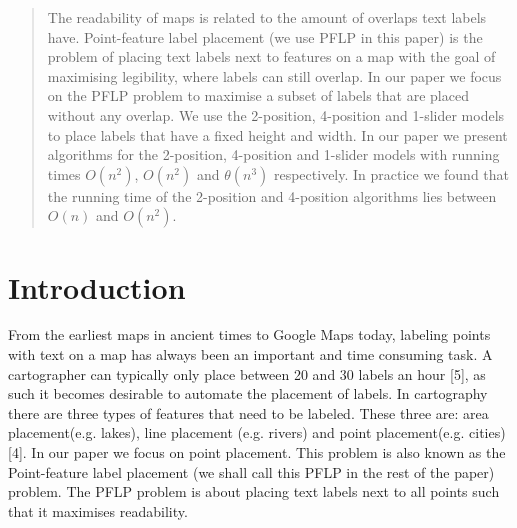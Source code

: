 \documentclass[crop=false,a4paper,oneside,11pt]{standalone}
\begin{document}
\begin{abstract}
The readability of maps is related to the amount of overlaps text labels have. Point-feature label placement (we use PFLP in this paper) is the problem of placing text labels next to features on a map with the goal of maximising legibility, where labels can still overlap. In our paper we focus on the PFLP problem to maximise a subset of labels that are placed without any overlap. We use the 2-position, 4-position and 1-slider models to place labels that have a fixed height and width. In our paper we present algorithms for the 2-position, 4-position and 1-slider models with running times $O(n^2)$, $O(n^2)$ and $\theta(n^3)$ respectively. In practice we found that the running time of the 2-position and 4-position algorithms lies between $O(n)$ and $O(n^2)$.
\end{abstract}

\section{Introduction}
From the earliest maps in ancient times to Google Maps today, labeling points with text on a map has always been an important and time consuming task. A cartographer can typically only place between 20 and 30 labels an hour [5], as such it becomes desirable to automate the placement of labels. In cartography there are three types of features that need to be labeled. These three are: area placement(e.g. lakes), line placement (e.g. rivers) and point placement(e.g. cities) [4]. In our paper we focus on point placement. This problem is also known as the Point-feature label placement (we shall call this PFLP in the rest of the paper) problem. The PFLP problem is about placing text labels next to all points such that it maximises readability.
\end{document}
